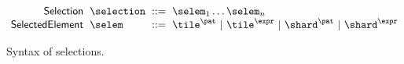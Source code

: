 \begin{figure}
  \vspace{-3px}
  \[
  \arraycolsep=3pt\begin{array}{rlrl}
      \mathsf{Selection} & \selection & ::= &
        \selem_1\dots\selem_n \\
      \mathsf{SelectedElement} & \selem & ::= &
        \tile^{\pat} ~\vert~
        \tile^{\expr} ~\vert~
        \shard^{\pat} ~\vert~
        \shard^{\expr}
  \end{array}\]
  \caption{
    Syntax of selections.
  }
  \label{fig:selection-syntax}
\end{figure}